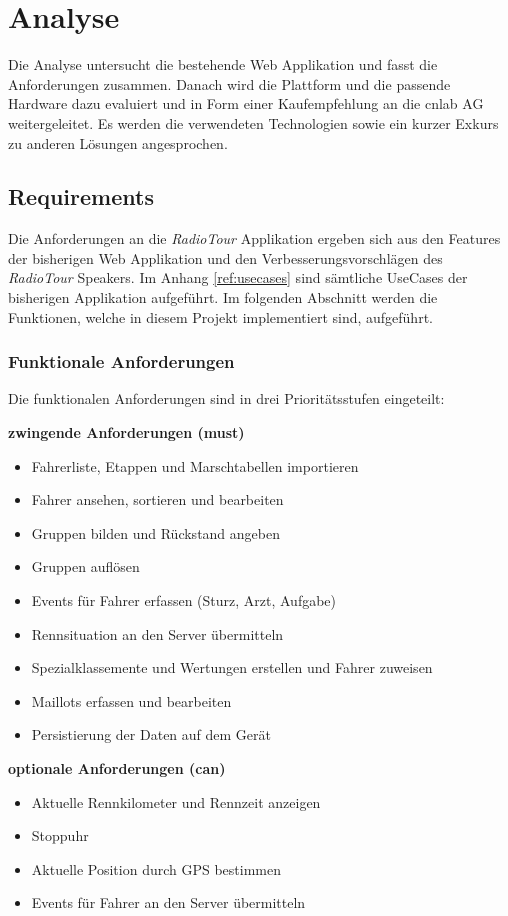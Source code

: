 \chapter{Analyse}
Die Analyse untersucht die bestehende Web Applikation und fasst die Anforderungen zusammen. Danach wird die Plattform und die passende Hardware dazu evaluiert und in Form einer Kaufempfehlung an die cnlab AG weitergeleitet. Es werden die verwendeten Technologien sowie ein kurzer Exkurs zu anderen Lösungen angesprochen.

\section{Requirements}
\label{sec:requirements}
Die Anforderungen an die \textit{RadioTour} Applikation ergeben sich aus den Features der bisherigen Web Applikation und den Verbesserungsvorschlägen des \textit{RadioTour} Speakers. Im Anhang \ref{ref:usecases} sind sämtliche UseCases der bisherigen Applikation aufgeführt. Im folgenden Abschnitt werden die Funktionen, welche in diesem Projekt implementiert sind, aufgeführt.

\subsection{Funktionale Anforderungen}
Die funktionalen Anforderungen sind in drei Prioritätsstufen eingeteilt:

\textbf{zwingende Anforderungen (must)}
\begin{itemize}
\item Fahrerliste, Etappen und Marschtabellen importieren
\item Fahrer ansehen, sortieren und bearbeiten
\item Gruppen bilden und Rückstand angeben
\item Gruppen auflösen
\item Events für Fahrer erfassen (Sturz, Arzt, Aufgabe)
\item Rennsituation an den Server übermitteln
\item Spezialklassemente und Wertungen erstellen und Fahrer zuweisen
\item Maillots erfassen und bearbeiten
\item Persistierung der Daten auf dem Gerät

\end{itemize}


\textbf{optionale Anforderungen (can)}
\begin{itemize}
\item Aktuelle Rennkilometer und Rennzeit anzeigen
\item Stoppuhr
\item Aktuelle Position durch GPS bestimmen
\item Events für Fahrer an den Server übermitteln
\end{itemize}


